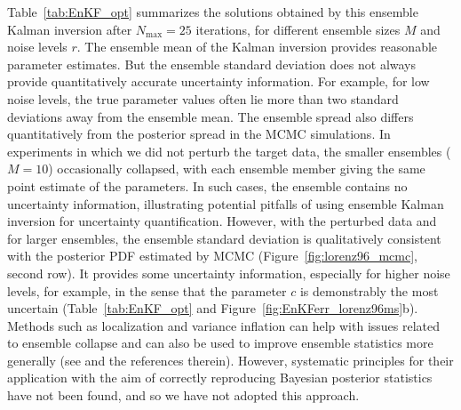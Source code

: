 \documentclass[draft]{agujournal}
\begin{document}
Table~\ref{tab:EnKF_opt} summarizes the solutions obtained by this ensemble Kalman inversion after $N_{\max}=25$ iterations, for different ensemble sizes $M$ and noise levels $r$. The ensemble mean of the Kalman inversion provides reasonable parameter estimates. But the ensemble standard deviation does not always provide quantitatively accurate uncertainty information. For example, for low noise levels, the true parameter values often lie more than two standard deviations away from the ensemble mean. The ensemble spread also differs quantitatively from the posterior spread in the MCMC simulations. In experiments in which we did not perturb the target data, the smaller ensembles ($M=10$) occasionally collapsed, with each ensemble member giving the same point estimate of the parameters. In such cases, the ensemble contains no uncertainty information, illustrating potential pitfalls of using ensemble Kalman inversion for uncertainty quantification. However, with the perturbed data and for larger ensembles, the ensemble standard deviation is qualitatively consistent with the posterior PDF estimated by MCMC (Figure~\ref{fig:lorenz96_mcmc}, second row). It provides some uncertainty information, especially for higher noise levels, for example, in the sense that the parameter $c$ is demonstrably the most uncertain (Table~\ref{tab:EnKF_opt} and Figure~\ref{fig:EnKFerr_lorenz96ms}b). Methods such as localization and variance inflation can help with issues related to ensemble collapse and can also be used to improve ensemble statistics more generally (see \cite{Law15a} and the references therein). However, systematic principles for their application with the aim of correctly reproducing Bayesian posterior statistics have not been found, and so we have not adopted this approach.
\end{document}
